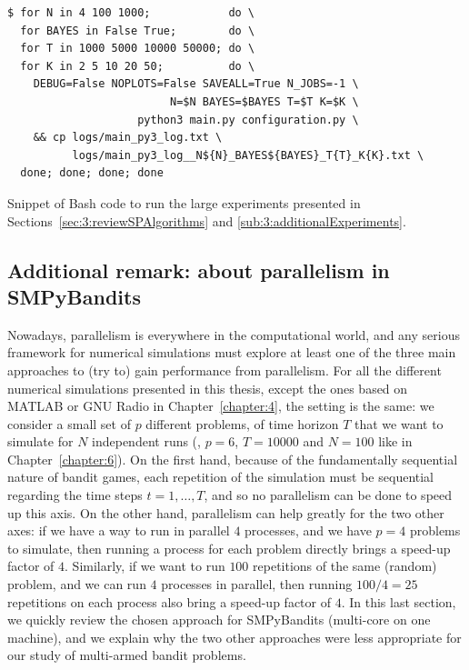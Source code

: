 \begin{listing}[h!]
    \begin{verbatim}
$ for N in 4 100 1000;            do \
  for BAYES in False True;        do \
  for T in 1000 5000 10000 50000; do \
  for K in 2 5 10 20 50;          do \
    DEBUG=False NOPLOTS=False SAVEALL=True N_JOBS=-1 \
                         N=$N BAYES=$BAYES T=$T K=$K \
                    python3 main.py configuration.py \
    && cp logs/main_py3_log.txt \
          logs/main_py3_log__N${N}_BAYES${BAYES}_T{T}_K{K}.txt \
  done; done; done; done
    \end{verbatim}
    \caption{Snippet of Bash code to run the large experiments presented in Sections~\ref{sec:3:reviewSPAlgorithms} and \ref{sub:3:additionalExperiments}.}
    \label{lst:3:BashCodeToLaunchLargeExperiments}
\end{listing}


\subsection{Additional remark: about parallelism in SMPyBandits}
\label{sub:3:parallelSimulations}


Nowadays, parallelism is everywhere in the computational world, and any serious framework for numerical simulations must explore at least one of the three main approaches to (try to) gain performance from parallelism.
%
For all the different numerical simulations presented in this thesis, except the ones based on MATLAB or GNU Radio in Chapter~\ref{chapter:4}, the setting is the same: we consider a small set of $p$ different problems, of time horizon $T$ that we want to simulate for $N$ independent runs (\eg, $p=6$, $T=10000$ and $N=100$ like in Chapter~\ref{chapter:6}).
On the first hand, because of the fundamentally sequential nature of bandit games, each repetition of the simulation must be sequential regarding the time steps $t=1,\dots,T$, and so no parallelism can be done to speed up this axis.
On the other hand, parallelism can help greatly for the two other axes: if we have a way to run in parallel $4$ processes, and we have $p=4$ problems to simulate, then running a process for each problem directly brings a speed-up factor of $4$.
Similarly, if we want to run $100$ repetitions of the same (random) problem, and we can run $4$ processes in parallel, then running $100/4=25$ repetitions on each process also bring a speed-up factor of $4$.
%
In this last section, we quickly review the chosen approach for SMPyBandits (multi-core on one machine), and we explain why the two other approaches were less appropriate for our study of multi-armed bandit problems.

